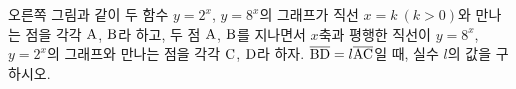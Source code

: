 \noindent\begin{minipage}[t]{0.58\linewidth}\vspace{0pt}\raggedright 오른쪽 그림과 같이 두 함수 $y=2^{x}$, $y=8^{x}$의 그래프가 직선 $x=k\ (k>0)$와 만나는 점을 각각 $\mathrm{A}$, $\mathrm{B}$라 하고, 두 점 $\mathrm{A}$, $\mathrm{B}$를 지나면서 $x$축과 평행한 직선이 $y=8^{x}$, $y=2^{x}$의 그래프와 만나는 점을 각각 $\mathrm{C}$, $\mathrm{D}$라 하자. $\overline{\mathrm{BD}}=l\overline{\mathrm{AC}}$일 때, 실수 $l$의 값을 구하시오.\end{minipage}\hfill\begin{minipage}[t]{0.4\linewidth}\vspace{0pt}\centering \resizebox{\ifdim\width>\linewidth\linewidth\else\width\fi}{!}{}\end{minipage}\par

